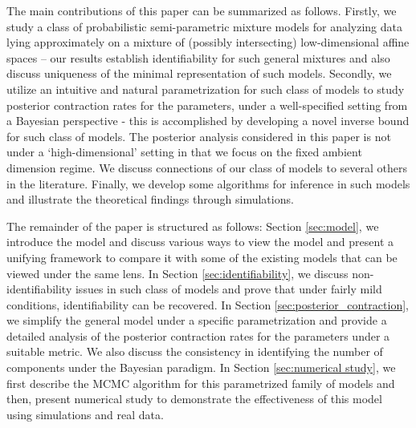 \documentclass[bj,authoryear]{imsart}
\theoremstyle{plain}
\theoremstyle{remark}
\begin{document}
The main contributions of this paper can be summarized as follows. Firstly, we study a class of probabilistic semi-parametric mixture models for analyzing data lying approximately on a mixture of (possibly intersecting) low-dimensional affine spaces -- our results establish identifiability for such general mixtures and also discuss uniqueness of the minimal representation of such models. Secondly, we utilize an intuitive and natural parametrization for such class of models to study posterior contraction rates for the parameters, under a well-specified setting from a Bayesian perspective - this is accomplished by developing a novel inverse bound for such class of models. The posterior analysis considered in this paper is not under a `high-dimensional' setting in that we focus on the fixed ambient dimension regime. We discuss connections of our class of models to several others in the literature. Finally, we develop some algorithms for inference in such models and illustrate the theoretical findings through simulations. 

The remainder of the paper is structured as follows: Section \ref{sec:model}, we introduce the model and discuss various ways to view the model and present a unifying framework to compare it with some of the existing models that can be viewed under the same lens. In Section \ref{sec:identifiability}, we discuss non-identifiability issues in such class of models and prove that under fairly mild conditions, identifiability can be recovered. In Section \ref{sec:posterior_contraction}, we simplify the general model under a specific parametrization and provide a detailed analysis of the posterior contraction rates for the parameters under a suitable metric. We also discuss the consistency in identifying the number of components under the Bayesian paradigm. In Section \ref{sec:numerical study}, we first describe the MCMC algorithm for this parametrized family of models and then, present numerical study to demonstrate the effectiveness of this model using simulations and real data. 
\end{document}
